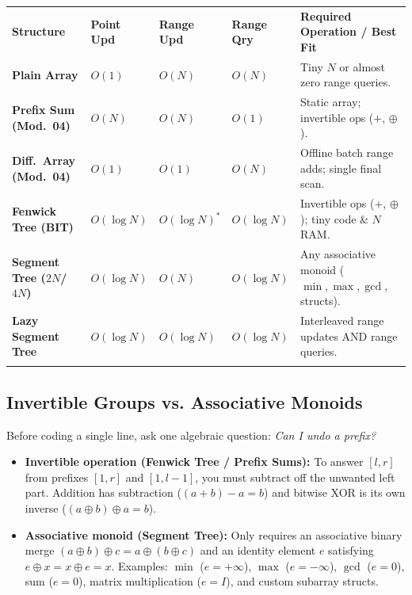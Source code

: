 \documentclass[11pt,a4paper]{article}
\theoremstyle{definition}
\begin{document}
\begingroup\footnotesize{}
\begin{tabularx}{\textwidth}{>{\raggedright\arraybackslash\bfseries}p{3.1cm} >{\centering\arraybackslash}p{1.5cm} >{\centering\arraybackslash}p{1.5cm} >{\centering\arraybackslash}p{1.5cm} >{\raggedright\arraybackslash}X}
\arrayrulecolor{primaryblue}\toprule[1.2pt]
\rowcolor{primaryblue!10}
\textcolor{primaryblue}{\textbf{Structure}} & \textcolor{primaryblue}{\textbf{Point Upd}} & \textcolor{primaryblue}{\textbf{Range Upd}} & \textcolor{primaryblue}{\textbf{Range Qry}} & \textcolor{primaryblue}{\textbf{Required Operation / Best Fit}} \\
\arrayrulecolor{codeframe}\midrule[0.6pt]
Plain Array & $O(1)$ & $O(N)$ & $O(N)$ & Tiny $N$ or almost zero range queries. \\
Prefix Sum (Mod.\ 04) & $O(N)$ & $O(N)$ & $O(1)$ & Static array; invertible ops ($+$, $\oplus$). \\
Diff.\ Array (Mod.\ 04) & $O(1)$ & $O(1)$ & $O(N)$ & Offline batch range adds; single final scan. \\
Fenwick Tree (BIT) & $O(\log N)$ & $O(\log N)^*$ & $O(\log N)$ & Invertible ops ($+$, $\oplus$); tiny code \& $N$ RAM. \\
Segment Tree ($2N$/$4N$) & $O(\log N)$ & $O(N)$ & $O(\log N)$ & Any associative monoid ($\min, \max, \gcd$, structs). \\
Lazy Segment Tree & $O(\log N)$ & $O(\log N)$ & $O(\log N)$ & Interleaved range updates AND range queries. \\
\arrayrulecolor{primaryblue}\bottomrule[1.2pt]
\end{tabularx}\endgroup
\par\smallskip{}

\subsection{Invertible Groups vs. Associative Monoids}

Before coding a single line, ask one algebraic question: \emph{Can I undo a prefix?}
\begin{itemize}
    \item \textbf{Invertible operation (Fenwick Tree / Prefix Sums):} To answer $[l, r]$ from prefixes $[1, r]$ and $[1, l-1]$, you must subtract off the unwanted left part. Addition has subtraction ($(a + b) - a = b$) and bitwise XOR is its own inverse ($(a \oplus b) \oplus a = b$).
    \item \textbf{Associative monoid (Segment Tree):} Only requires an associative binary merge $(a \oplus b) \oplus c = a \oplus (b \oplus c)$ and an identity element $e$ satisfying $e \oplus x = x \oplus e = x$. Examples: $\min$ ($e = +\infty$), $\max$ ($e = -\infty$), $\gcd$ ($e = 0$), sum ($e = 0$), matrix multiplication ($e = I$), and custom subarray structs.
\end{itemize}
\end{document}
